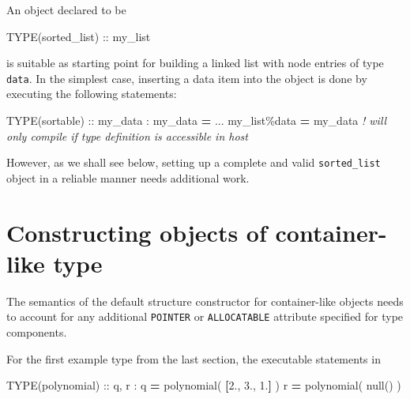 \documentclass[
]{scrartcl}
\newenvironment{Shaded}{}{}
\newcommand{\CommentTok}[1]{\textcolor[rgb]{0.38,0.63,0.69}{\textit{#1}}}
\newcommand{\DataTypeTok}[1]{\textcolor[rgb]{0.56,0.13,0.00}{#1}}
\newcommand{\FloatTok}[1]{\textcolor[rgb]{0.25,0.63,0.44}{#1}}
\newcommand{\KeywordTok}[1]{\textcolor[rgb]{0.00,0.44,0.13}{\textbf{#1}}}
\newcommand{\NormalTok}[1]{#1}
\newcommand{\OperatorTok}[1]{\textcolor[rgb]{0.40,0.40,0.40}{#1}}
\begin{document}
An object declared to be

\begin{Shaded}
\begin{Highlighting}[]
\DataTypeTok{TYPE(sorted\_list)} \DataTypeTok{::}\NormalTok{ my\_list}
\end{Highlighting}
\end{Shaded}

is suitable as starting point for building a linked list with node
entries of type \texttt{data}. In the simplest case, inserting a data
item into the object is done by executing the following statements:

\begin{Shaded}
\begin{Highlighting}[]
\DataTypeTok{TYPE(sortable)} \DataTypeTok{::}\NormalTok{ my\_data}
\NormalTok{:}
\NormalTok{my\_data }\KeywordTok{=}\NormalTok{ ...}
\NormalTok{my\_list}\OperatorTok{\%}\NormalTok{data }\KeywordTok{=}\NormalTok{ my\_data  }\CommentTok{! will only compile if type definition is accessible in host}
\end{Highlighting}
\end{Shaded}

However, as we shall see below, setting up a complete and valid
\texttt{sorted\_list} object in a reliable manner needs additional work.

\section{Constructing objects of container-like
type}\label{constructing-objects-of-container-like-type}

The semantics of the default structure constructor for container-like
objects needs to account for any additional \texttt{POINTER} or
\texttt{ALLOCATABLE} attribute specified for type components.

For the first example type from the last section, the executable
statements in

\begin{Shaded}
\begin{Highlighting}[]
\DataTypeTok{TYPE(polynomial)} \DataTypeTok{::}\NormalTok{ q, r}
\NormalTok{:}
\NormalTok{q }\KeywordTok{=}\NormalTok{ polynomial( }\KeywordTok{[}\FloatTok{2.}\NormalTok{, }\FloatTok{3.}\NormalTok{, }\FloatTok{1.}\KeywordTok{]}\NormalTok{ )}
\NormalTok{r }\KeywordTok{=}\NormalTok{ polynomial( null() )}
\end{Highlighting}
\end{Shaded}
\end{document}
